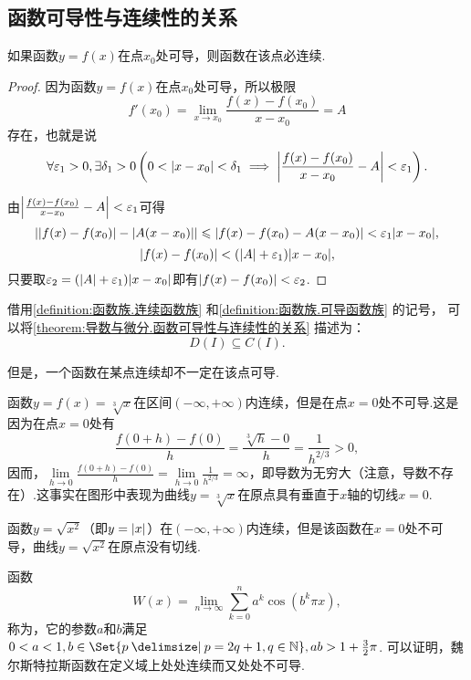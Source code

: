 \subsection{函数可导性与连续性的关系}
\begin{theorem}\label{theorem:导数与微分.函数可导性与连续性的关系}
如果函数\(y = f(x)\)在点\(x_0\)处可导，则函数在该点必连续.
\begin{proof}
因为函数\(y = f(x)\)在点\(x_0\)处可导，所以极限\[
f'(x_0) = \lim\limits_{x \to x_0}\frac{f(x)-f(x_0)}{x-x_0} = A
\]存在，也就是说\[
\forall \varepsilon_1 > 0, \exists \delta_1 > 0 \left(
	0 < \abs{x-x_0} < \delta_1 \implies \abs{\frac{f(x)-f(x_0)}{x-x_0} - A} < \varepsilon_1
\right).
\]

由\(\abs{\frac{f(x)-f(x_0)}{x-x_0} - A} < \varepsilon_1\)可得\[
\abs{\abs{f(x)-f(x_0)} - \abs{A(x-x_0)}}
\leqslant \abs{f(x)-f(x_0) - A(x-x_0)}
< \varepsilon_1 \abs{x-x_0},
\]\[
\abs{f(x)-f(x_0)} < (\abs{A} + \varepsilon_1) \abs{x-x_0},
\]只要取\(\varepsilon_2 = (\abs{A} + \varepsilon_1) \abs{x-x_0}\)即有\(\abs{f(x)-f(x_0)} < \varepsilon_2\).
\end{proof}
\end{theorem}
借用\cref{definition:函数族.连续函数族} 和\cref{definition:函数族.可导函数族} 的记号，%
可以将\cref{theorem:导数与微分.函数可导性与连续性的关系} 描述为：\[
D(I) \subseteq C(I).
\]

但是，一个函数在某点连续却不一定在该点可导.
\begin{example}
函数\(y=f(x)=\sqrt[3]x\)在区间\((-\infty,+\infty)\)内连续，但是在点\(x=0\)处不可导.这是因为在点\(x=0\)处有\[
\frac{f(0+h)-f(0)}{h}
=\frac{\sqrt[3]{h}-0}{h}
=\frac{1}{h^{2/3}}>0,
\]因而，\(\lim\limits_{h\to0}\frac{f(0+h)-f(0)}{h}=\lim\limits_{h\to0}\frac{1}{h^{2/3}}=\infty\)，即导数为无穷大（注意，导数不存在）.这事实在图形中表现为曲线\(y=\sqrt[3]x\)在原点具有垂直于\(x\)轴的切线\(x=0\).
\end{example}

\begin{example}
函数\(y=\sqrt{x^2}\)（即\(y=\abs{x}\)）在\((-\infty,+\infty)\)内连续，但是该函数在\(x=0\)处不可导，曲线\(y=\sqrt{x^2}\)在原点没有切线.
\end{example}

\begin{example}
函数\[
W(x) = \lim\limits_{n\to\infty} \sum\limits_{k=0}^n a^k \cos(b^k \pi x),
\]称为，它的参数\(a\)和\(b\)满足\(0<a<1, b\in\Set{ p \given p = 2q+1, q\in\mathbb{N} }, ab > 1+\frac{3}{2}\pi\).
可以证明，魏尔斯特拉斯函数在定义域上处处连续而又处处不可导.
\end{example}

